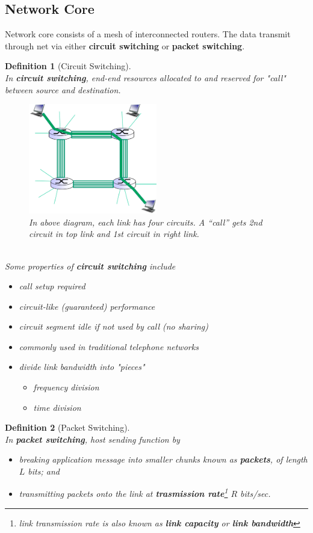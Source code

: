 \documentclass[12pt]{article}
\newtheorem{definition}{Definition}[section]
\theoremstyle{definition}
\begin{document}
\subsection{Network Core}
Network core consists of a mesh of interconnected routers. The data transmit through net via either \textbf{circuit switching} or \textbf{packet switching}.
\begin{definition}[Circuit Switching]
\hfill\\\normalfont In \textbf{circuit switching}, end-end resources allocated to and reserved for "call" between source and destination.
\begin{figure}[h]
\centering
\includegraphics[width = 0.5\textwidth]{1_3_1.png}
\caption{In above diagram, each link has four circuits. A “call” gets 2nd circuit in top link and 1st circuit in right link.}
\end{figure}\\
Some properties of \textbf{circuit switching} include
\begin{itemize}
  \item call setup required
  \item circuit-like (guaranteed) performance
  \item circuit segment idle if not used by call (no sharing)
  \item \textit{commonly used in traditional telephone networks}
  \item divide link bandwidth into "pieces"
  \begin{itemize}
    \item frequency division
    \item time division
  \end{itemize}
\end{itemize}

\end{definition}
\begin{definition}[Packet Switching]
\hfill\\\normalfont In \textbf{packet switching}, host sending function by 
\begin{itemize}
\item breaking application message into smaller chunks known as \textbf{packets}, of length $L$ bits; and
\item transmitting packets onto the link at \textbf{trasmission rate}\footnote{link transmission rate is also known as \textbf{link capacity} or \textbf{link bandwidth}} $R$ bits/sec.
\end{itemize}
\end{definition}
\end{document}
